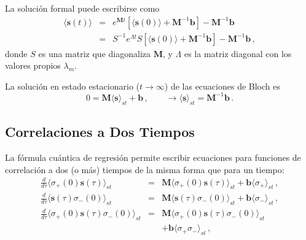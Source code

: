 \documentclass[twocolumn,aps,eqsecnum]{revtex4}
\begin{document}
La soluci\'on formal puede escribirse como 
%
\begin{subequations}
\begin{eqnarray}
\langle \mathbf{s}(t) \rangle &=& e^{ \mathbf{M} t } \left[ 
	 \langle \mathbf{s}(0) \rangle +\mathbf{M}^{-1} \mathbf{b} \right] 
	-\mathbf{M}^{-1} \mathbf{b}	\\
&=& S^{-1} e^{\Lambda t} S \left[ \langle \mathbf{s}(0) \rangle 
	+\mathbf{M}^{-1} \mathbf{b} \right] -\mathbf{M}^{-1} \mathbf{b} \,, 
\end{eqnarray} 
\end{subequations}
donde $S$ es una matriz que diagonaliza $\mathbf{M}$, y $\Lambda$ 
es la matriz diagonal con los valores propios $\lambda_m$.  

La soluci\'on en estado estacionario ($t \to \infty$) de las ecuaciones de 
Bloch es 
%
\begin{equation} 	\label{eq:Bloch_est}
0 =\mathbf{M} \langle \mathbf{s} \rangle_{st} +\mathbf{b}  \,, 
    \qquad \to \langle \mathbf{s} \rangle_{st} 
       =\mathbf{M}^{-1} \mathbf{b} \,.  	
\end{equation}

\subsection{Correlaciones a Dos Tiempos} 
La f\'ormula cu\'antica de regresi\'on permite escribir ecuaciones para 
funciones de correlaci\'on a dos (o m\'as) tiempos de la misma forma 
que para un tiempo: 
%
\begin{eqnarray*}
\frac{d}{d \tau} \langle \sigma_{+}(0) \mathbf{s} (\tau) \rangle_{st} 
 &=& \mathbf{M} \langle \sigma_{+}(0) \mathbf{s} (\tau) \rangle_{st} 
	+\mathbf{b} \langle \sigma_{+} \rangle_{st} \,,	\\ 
%
\frac{d}{d \tau} \langle \mathbf{s} (\tau) \sigma_{-}(0)  \rangle_{st} 
 &=& \mathbf{M} \langle \mathbf{s} (\tau) \sigma_{-}(0)  \rangle_{st} 
	+\mathbf{b} \langle \sigma_{-} \rangle_{st} \,,	\\ 
%
\frac{d}{d \tau} \langle \sigma_{+}(0) \mathbf{s} (\tau) 
	\sigma_{-}(0) \rangle_{st}  
 &=& \mathbf{M} \langle \sigma_{+}(0) \mathbf{s} (\tau) 
 	\sigma_{-}(0) \rangle_{st}  	\\ 
	&& +\mathbf{b} \langle \sigma_{+} \sigma_{-} \rangle_{st} 	\,,
\end{eqnarray*}
\end{document}
